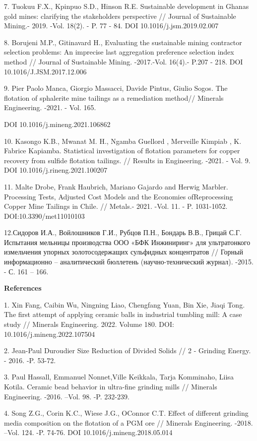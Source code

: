 7. Tuokuu F.X., Kpinpuo S.D., Hinson R.E. Sustainable development in
Ghana\textquotesingle s gold mines: clarifying the
stakeholder\textquotesingle s perspective // Journal of Sustainable
Mining.- 2019. -Vol. 18(2). - P. 77 - 84. DOI 10.1016/j.jsm.2019.02.007

8. Borujeni M.P., Gitinavard H., Evaluating the sustainable mining
contractor selection problems: An imprecise last aggregation preference
selection index method // Journal of Sustainable Mining. -2017.-Vol.
16(4).- P.207 - 218. DOI 10.1016/J.JSM.2017.12.006

9. Pier Paolo Manca, Giorgio Massacci, Davide Pintus, Giulio Sogos. The
flotation of sphalerite mine tailings as a remediation method// Minerals
Engineering. -2021. - Vol. 165.

DOI 10.1016/j.mineng.2021.106862

10. Kasongo K.B., Mwanat M. H., Ngamba Guellord , Merveille Kimpiab , K.
Fabrice Kapiamba. Statistical investigation of flotation parameters for
copper recovery from sulfide flotation tailings. // Results in
Engineering. -2021. - Vol. 9. DOI 10.1016/j.rineng.2021.100207

11. Malte Drobe, Frank Haubrich, Mariano Gajardo and Herwig Marbler.
Processing Tests, Adjusted Cost Models and the Economies ofReprocessing
Copper Mine Tailings in Chile. // Metals.- 2021. -Vol. 11. - P.
1031-1052. DOI:10.3390/met11010103

12.Сидоров И.А., Войлошников Г.И., Рубцов П.Н., Бондарь В.В., Грицай
С.Г. Испытания мельницы производства ООО «БФК Инжиниринг» для
ультратонкого измельчения упорных золотосодержащих сульфидных
концентратов // Горный информационно -- аналитический бюллетень
(научно-технический журнал). -2015. - С. 161 -- 166.

{\bfseries References}

1. Xin Fang, Caibin Wu, Ningning Liao, Chengfang Yuan, Bin Xie, Jiaqi
Tong. The first attempt of applying ceramic balls in industrial tumbling
mill: A case study // Minerals Engineering. 2022. Volume 180. DOI:
10.1016/j.mineng.2022.107504

2. Jean-Paul Duroudier Size Reduction of Divided Solids // 2 - Grinding
Energy. - 2016. -P. 53-72.

3. Paul Hassall, Emmanuel Nonnet,Ville Keikkala, Tarja Komminaho, Liisa
Kotila. Ceramic bead behavior in ultra-fine grinding mills // Minerals
Engineering. -2016. --Vol. 98. -P. 232-239.

4. Song Z.G., Corin K.C., Wiese J.G., O\textquotesingle Connor C.T.
Effect of different grinding media composition on the flotation of a PGM
ore // Minerals Engineering. -2018. --Vol. 124. -P. 74-76. DOI
10.1016/j.mineng.2018.05.014

